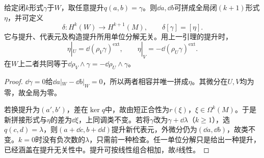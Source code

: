 \begin{proposition}[连接映射的构造]\label{prop:mv-connecting}
给定闭$k$形式$\gamma$于$W$，取任意提升$q(a,b)=\gamma$。则$\dd a,\dd b$可拼成全局闭$(k+1)$形式$\eta$，并可定义
\[
 \delta:H^k(W)\to H^{k+1}(M),\qquad\delta[\gamma]=[\eta].
\]
它与提升、代表元及构造提升所用单位分解无关。用上一引理的提升时，
\[
 \eta|_U=\dd(\rho_V\gamma)^{\mathrm{ext}},\qquad
 \eta|_V=-\dd(\rho_U\gamma)^{\mathrm{ext}}.
\]
在$W$上二者共同等于$\dd\rho_V\wedge\gamma=-\dd\rho_U\wedge\gamma$。
\end{proposition}
\begin{proof}
$\dd\gamma=0$给$\dd a|_W-\dd b|_W=0$，所以两者相容并唯一拼成$\eta$。其微分在$U,V$均为零，故全局为零。

若换提升为$(a',b')$，差在$\ker q$中，故由短正合性为$r(\xi)$，$\xi\in\Omega^k(M)$。于是新拼接形式与$\eta$的差为$\dd\xi$，上同调类不变。若将$\gamma$改为$\gamma+\dd\lambda$（$k\geq1$），选$q(c,d)=\lambda$，则$(a+\dd c,b+\dd d)$提升新代表元，外微分仍为$(\dd a,\dd b)$，故类不变。$k=0$时没有负次数的$\lambda$，只需前一种检查。任一单位分解只是给出一种提升，已经涵盖在提升无关性中。提升可按线性组合相加，故$\delta$线性。
\end{proof}

